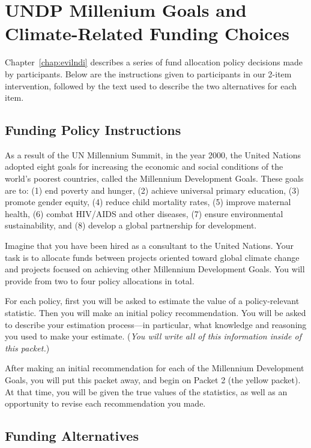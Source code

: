 \chapter{UNDP Millenium Goals and Climate-Related Funding Choices}
\label{app:undp}

Chapter~\ref{chap:evilndi} describes a series of fund allocation policy
decisions made by participants. Below are the instructions given to participants
in our 2-item intervention, followed by the text used to describe the two
alternatives for each item.

\section{Funding Policy Instructions}

As a result of the UN Millennium Summit, in the year 2000, the United Nations
adopted eight goals for increasing the economic and social conditions of the
world’s poorest countries, called the Millennium Development Goals.  These goals
are to: (1) end poverty and hunger, (2) achieve universal primary education, (3)
promote gender equity, (4) reduce child mortality rates, (5) improve maternal
health, (6) combat HIV/AIDS and other diseases, (7) ensure environmental
sustainability, and (8) develop a global partnership for development. 

Imagine that you have been hired as a consultant to the United Nations. Your
task is to allocate funds between projects oriented toward global climate change
and projects focused on achieving other Millennium Development Goals. You will
provide from two to four policy allocations in total. 

For each policy, first you will be asked to estimate the value of a
policy-relevant statistic. Then you will make an initial policy recommendation.
You will be asked to describe your estimation process---in particular, what
knowledge and reasoning you used to make your estimate. (\emph{You will write
    all of this information inside of this packet.})

After making an initial recommendation for each of the Millennium Development
Goals, you will put this packet away, and begin on Packet 2 (the yellow packet).
At that time, you will be given the true values of the statistics, as well as an
opportunity to revise each recommendation you made.

\section{Funding Alternatives}

